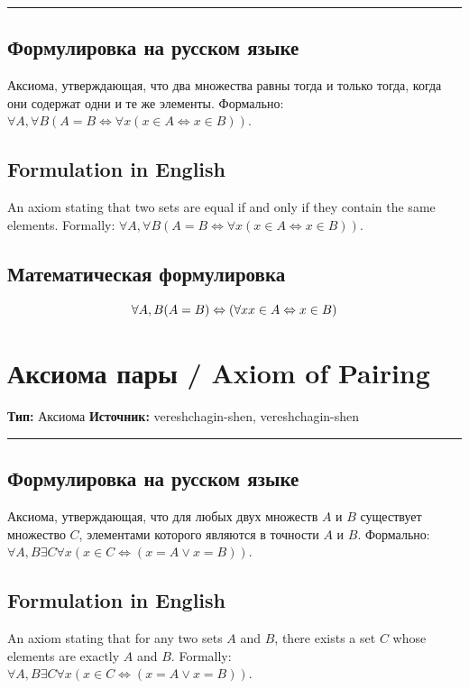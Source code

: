 \documentclass[12pt,a4paper]{report}
\begin{document}
\begin{object}
\vspace{0.5em}
\hrule
\vspace{1em}

\section*{Формулировка на русском языке}
Аксиома, утверждающая, что два множества равны тогда и только тогда, когда они содержат одни и те же элементы. Формально: $\forall A, \forall B (A = B \iff \forall x (x \in A \iff x \in B))$.

\section*{Formulation in English}
An axiom stating that two sets are equal if and only if they contain the same elements. Formally: $\forall A, \forall B (A = B \iff \forall x (x \in A \iff x \in B))$.

\section*{Математическая формулировка}
\hypertarget{axm-zfc-extensionality}{}
\hypertarget{axm-zfc-extensionality}{}
\begin{axiom} %



\[
\forall{A, B}
(A = B) \Leftrightarrow (\forall{x} x \in A \Leftrightarrow x \in B)
\]
\end{axiom}

\chapter{Аксиома пары / Axiom of Pairing}\label{entity:axm-zfc-pairing}
\textbf{Тип:} Аксиома \hfill \textbf{Источник:} vereshchagin-shen, vereshchagin-shen

\vspace{0.5em}
\hrule
\vspace{1em}

\section*{Формулировка на русском языке}
Аксиома, утверждающая, что для любых двух множеств $A$ и $B$ существует множество $C$, элементами которого являются в точности $A$ и $B$. Формально: $\forall A, B \exists C \forall x (x \in C \iff (x = A \lor x = B))$.

\section*{Formulation in English}
An axiom stating that for any two sets $A$ and $B$, there exists a set $C$ whose elements are exactly $A$ and $B$. Formally: $\forall A, B \exists C \forall x (x \in C \iff (x = A \lor x = B))$.


\end{object}
\end{document}
